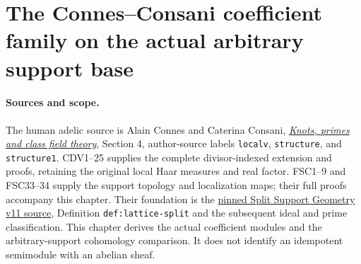 \section{The Connes--Consani coefficient family on the actual arbitrary support base}
\label{sec:arbitrary-support-cc}

\paragraph{Sources and scope.}
The human adelic source is Alain Connes and Caterina Consani,
\href{https://arxiv.org/abs/2501.06560v1}{\emph{Knots, primes and class
field theory}}, Section 4, author-source labels \texttt{localv},
\texttt{structure}, and \texttt{structure1}. CDV1--25 supplies the
complete divisor-indexed extension and proofs, retaining the original
local Haar measures and real factor. FSC1--9 and FSC33--34 supply the
support topology and localization maps; their full proofs accompany
this chapter. Their foundation is the
\href{https://github.com/KokunoYumeto/zeta-function-research-reader/blob/a2851f9eb352e7e4376bc629de86fa4ed9c1c434/workbenches/splitzero-tandem/foundations/split-support-geometry-v11/split_support_geometry_arithmetic_curve_v11.tex}{pinned Split Support Geometry v11 source},
Definition \texttt{def:lattice-split} and the subsequent ideal and prime
classification. This chapter derives the actual coefficient modules
and the arbitrary-support cohomology comparison. It does not identify
an idempotent semimodule with an abelian sheaf.

